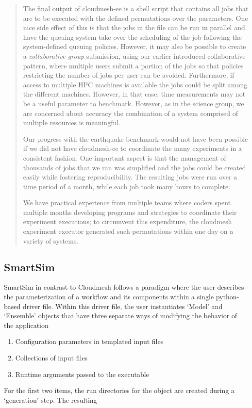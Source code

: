 \documentclass[utf8]{FrontiersinVancouver} %
\begin{document}
\begin{quote}
The final output of cloudmesh-ee is a shell script that contains all jobs that are to be executed with the defined permutations over the parameters. One nice side effect of this is that the jobs in the file can be run in parallel and have the queuing system take over the scheduling of the job following the system-defined queuing policies. However, it may also be possible to create a {\it collaborative group} submission, using our earlier introduced collaborative pattern, where multiple users submit a portion of the jobs so that policies restricting the number of jobs per user can be avoided. Furthermore, if access to multiple HPC machines is available the jobs could be split among the different machines. However, in that case, time measurements may not be a useful parameter to benchmark. However, as in the science group, we are concerned about accuracy the combination of a system comprised of multiple resources is meaningful.

Our progress with the earthquake benchmark would not have been possible if we did not have cloudmesh-ee to coordinate the many experiments in a consistent fashion. One important aspect is that the management of thousands of jobs that we ran was simplified and the jobs could be created easily while fostering reproducibility. The resulting jobs were run over a time period of a month, while each job took many hours to complete.

We have practical experience from multiple teams where coders spent multiple months developing programs and strategies to coordinate their experiment executions; to circumvent this expenditure, the cloudmesh experiment executor generated such permutations within one day on a variety of systems.

\end{quote}

\subsection{SmartSim}

SmartSim in contrast to Cloudmesh follows a paradigm where the user describes the parameterization of a workflow and its components within a single python-based driver file. Within this driver file, the user instantiates `Model' and `Ensemble' objects that have three separate ways of modifying the behavior of the application
\begin{enumerate}
    \item Configuration parameters in templated input files
    \item Collections of input files
    \item Runtime arguments passed to the executable
\end{enumerate}
For the first two items, the run directories for the object are created during a `generation' step. The resulting
\end{document}
